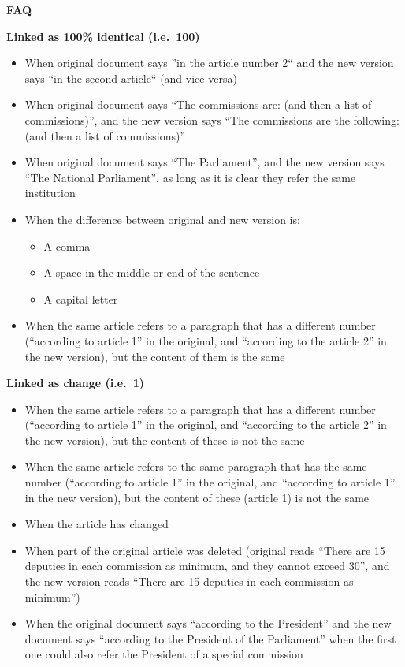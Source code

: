 \documentclass[10pt,]{article}
\providecommand{\tightlist}{%
  \setlength{\itemsep}{0pt}\setlength{\parskip}{0pt}}
\begin{document}
\textbf{FAQ}

\textbf{Linked as 100\% identical (i.e.~100)}

\begin{itemize}
\tightlist
\item
  When original document says ''in the article number 2`` and the new
  version says ``in the second article`` (and vice versa)
\item
  When original document says ``The commissions are: (and then a list of
  commissions)'', and the new version says ``The commissions are the
  following: (and then a list of commissions)''
\item
  When original document says ``The Parliament'', and the new version
  says ``The National Parliament'', as long as it is clear they refer
  the same institution
\item
  When the difference between original and new version is:

  \begin{itemize}
  \tightlist
  \item
    A comma
  \item
    A space in the middle or end of the sentence
  \item
    A capital letter
  \end{itemize}
\item
  When the same article refers to a paragraph that has a different
  number (``according to article 1'' in the original, and ``according to
  the article 2'' in the new version), but the content of them is the
  same
\end{itemize}

\textbf{Linked as change (i.e.~1)}

\begin{itemize}
\tightlist
\item
  When the same article refers to a paragraph that has a different
  number (``according to article 1'' in the original, and ``according to
  the article 2'' in the new version), but the content of these is not
  the same
\item
  When the same article refers to the same paragraph that has the same
  number (``according to article 1'' in the original, and ``according to
  article 1'' in the new version), but the content of these (article 1)
  is not the same
\item
  When the article has changed
\item
  When part of the original article was deleted (original reads ``There
  are 15 deputies in each commission as minimum, and they cannot exceed
  30'', and the new version reads ``There are 15 deputies in each
  commission as minimum'')
\item
  When the original document says ``according to the President'' and the
  new document says ``according to the President of the Parliament''
  when the first one could also refer the President of a special
  commission
\end{itemize}
\end{document}
